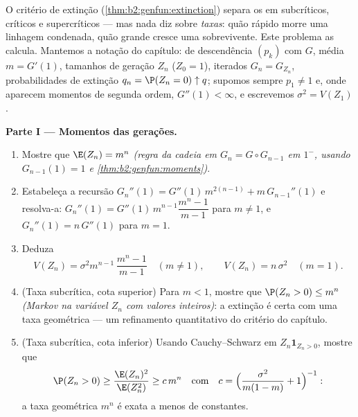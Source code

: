 \begin{problem}\label{pb:b2:genfun:1}
O critério de extinção (\cref{thm:b2:genfun:extinction})
separa os  em
subcríticos, críticos e supercríticos --- mas nada diz
sobre \emph{taxas}: quão rápido morre uma linhagem condenada, quão
grande cresce uma sobrevivente. Este problema as calcula. Mantemos
a notação do capítulo:  de descendência $(p_k)$ com  $G$,
média $m = G'(1)$, tamanhos de geração $Z_n$ ($Z_0 = 1$), iterados
$G_n = G_{Z_n}$, probabilidades de extinção $q_n = \P(Z_n = 0)
\uparrow q$; supomos sempre $p_1 \neq 1$ e, onde aparecem momentos
de segunda ordem, $G''(1) < \infty$, e escrevemos $\sigma^2 =
V(Z_1)$.

\medskip
\noindent\textbf{Parte I --- Momentos das gerações.}
\begin{enumerate}
  \item Mostre que $\E(Z_n) = m^n$ \emph{(regra da cadeia em $G_n = G
        \circ G_{n-1}$ em $1^-$, usando $G_{n-1}(1) = 1$ e
        \cref{thm:b2:genfun:moments})}.
  \item Estabeleça a recursão $G_n''(1) =
        G''(1)\,m^{2(n-1)} + m\,G_{n-1}''(1)$ e resolva-a:
        $G_n''(1) = G''(1)\,m^{n-1}\dfrac{m^n - 1}{m - 1}$
        para $m \neq 1$, e $G_n''(1) = n\,G''(1)$ para $m =
        1$.
  \item Deduza
        \[
        V(Z_n) = \sigma^2m^{n-1}\,\frac{m^n - 1}{m - 1}
        \quad (m \neq 1),
        \qquad
        V(Z_n) = n\,\sigma^2 \quad (m = 1).
        \]
  \item (Taxa subcrítica, cota superior) Para $m < 1$, mostre que
        $\P(Z_n > 0) \leq m^n$ \emph{(Markov na
        variável $Z_n$ com valores inteiros)}: a extinção é certa com uma
        taxa geométrica --- um refinamento quantitativo do
        critério do capítulo.
  \item (Taxa subcrítica, cota inferior) Usando
        Cauchy--Schwarz em $Z_n\mathbf 1_{Z_n > 0}$, mostre que
        \[
        \P(Z_n > 0) \geq \frac{\E(Z_n)^2}{\E(Z_n^2)}
        \geq c\,m^{n}
        \quad\text{com}\quad
        c = \Bigl(\frac{\sigma^2}{m(1-m)} + 1\Bigr)^{-1} :
        \]
        a taxa geométrica $m^n$ é exata a menos de constantes.
\end{enumerate}


\end{problem}
